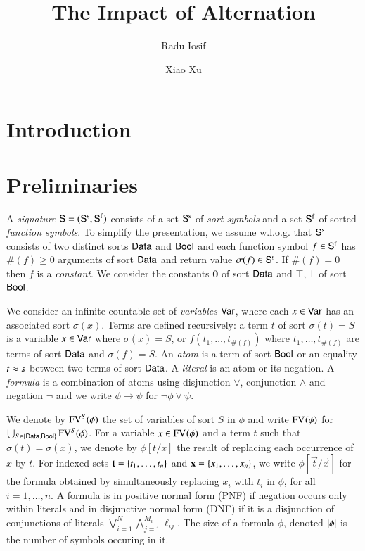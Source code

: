 \documentclass{llncs}
\begin{document}

\title{The Impact of Alternation}

\author{Radu Iosif \and Xiao Xu}


\maketitle

\begin{abstract}
\end{abstract}

\section{Introduction}

\section{Preliminaries}

A \emph{signature} $\mathsf{S} = (\mathsf{S}^\mathrm{s},\mathsf{S}^\mathrm{f})$ consists of a
set $\mathsf{S}^\mathrm{s}$ of \emph{sort symbols} and a set $\mathsf{S}^\mathrm{f}$ of
sorted \emph{function symbols}. To simplify the presentation, we
assume w.l.o.g. that $\mathsf{S}^\mathrm{s}$ consists of two distinct sorts
$\mathsf{Data}$ and $\mathsf{Bool}$ and each function symbol $f \in \mathsf{S}^\mathrm{f}$ has
$\#(f) \geq 0$ arguments of sort $\mathsf{Data}$ and return value $\sigma(f)
\in \mathsf{S}^\mathrm{s}$. If $\#(f)=0$ then $f$ is a \emph{constant}. We
consider the constants $\mathbf{0}$ of sort $\mathsf{Data}$ and $\top,\bot$ of
sort $\mathsf{Bool}$.

We consider an infinite countable set of \emph{variables} $\mathsf{Var}$,
where each $x \in \mathsf{Var}$ has an associated sort $\sigma(x)$. Terms are
defined recursively: a term $t$ of sort $\sigma(t)=S$ is a variable $x
\in \mathsf{Var}$ where $\sigma(x)=S$, or $f(t_1,\ldots,t_{\#(f)})$ where
$t_1,\ldots,t_{\#(f)}$ are terms of sort $\mathsf{Data}$ and $\sigma(f)=S$. An
\emph{atom} is a term of sort $\mathsf{Bool}$ or an equality $t \approx s$
between two terms of sort $\mathsf{Data}$. A \emph{literal} is an atom or its
negation. A \emph{formula} is a combination of atoms using disjunction
$\vee$, conjunction $\wedge$ and negation $\neg$ and we write $\phi
\rightarrow \psi$ for $\neg\phi \vee \psi$.

We denote by $\mathrm{FV}^{S}(\phi)$ the set of variables of sort $S$ in $\phi$
and write $\mathrm{FV}^{}(\phi)$ for $\bigcup_{S \in \left\{ \mathsf{Data},\mathsf{Bool} \right\}}
\mathrm{FV}^{S}(\phi)$. For a variable $x \in \mathrm{FV}^{}(\phi)$ and a term $t$ such
that $\sigma(t) = \sigma(x)$, we denote by $\phi[t/x]$ the result of
replacing each occurrence of $x$ by $t$. For indexed sets
$\mathbf t=\left\{ t_1,\ldots,t_n \right\}$ and $\mathbf x=\left\{ x_1,\ldots,x_n \right\}$, we
write $\phi[\vec{t}/\vec{x}]$ for the formula obtained by
simultaneously replacing $x_i$ with $t_i$ in $\phi$, for all
$i=1,\ldots,n$. A formula is in positive normal form (PNF) if negation
occurs only within literals and in disjunctive normal form (DNF) if it
is a disjunction of conjunctions of literals $\bigvee_{i=1}^N
\bigwedge_{j=1}^{M_i} \ell_{ij}$. The size of a formula $\phi$,
denoted ${|{\phi}|}$ is the number of symbols occuring in it.
\end{document}
